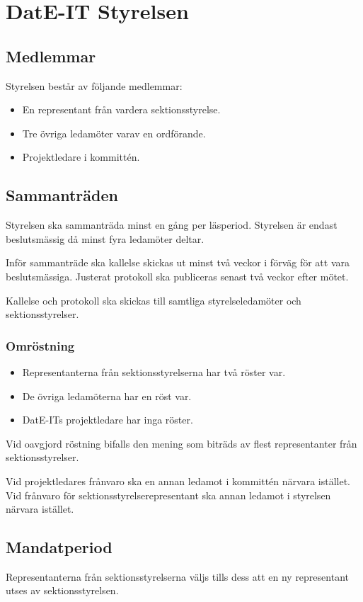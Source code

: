 \documentclass{article}
\begin{document}
\section{DatE-IT Styrelsen} \label{styrelse}
\subsection{Medlemmar}
Styrelsen består av följande medlemmar:
\begin{itemize}
    \item En representant från vardera sektionsstyrelse.
    \item Tre övriga ledamöter varav en ordförande.
    \item Projektledare i kommittén.
\end{itemize}

\subsection{Sammanträden}
Styrelsen ska sammanträda minst en gång per läsperiod. Styrelsen är endast beslutsmässig då minst fyra ledamöter deltar.

Inför sammanträde ska kallelse skickas ut minst två veckor i förväg för att vara beslutsmässiga. Justerat protokoll ska publiceras senast två veckor efter mötet.

Kallelse och protokoll ska skickas till samtliga styrelseledamöter och sektionsstyrelser.

\subsubsection{Omröstning}
\begin{itemize}
    \item Representanterna från sektionsstyrelserna har två röster var.
    \item De övriga ledamöterna har en röst var.
    \item DatE-ITs projektledare har inga röster.
\end{itemize}

Vid oavgjord röstning bifalls den mening som biträds av flest representanter från sektionsstyrelser.

Vid projektledares frånvaro ska en annan ledamot i kommittén närvara istället. Vid frånvaro för sektionsstyrelserepresentant ska annan ledamot i styrelsen närvara istället. 

\subsection{Mandatperiod}
Representanterna från sektionsstyrelserna väljs tills dess att en ny representant utses av sektionsstyrelsen.
\end{document}
